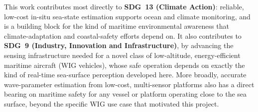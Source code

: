 This work contributes most directly to \textbf{SDG~13 (Climate Action)}: reliable, low-cost in-situ sea-state estimation supports ocean and climate monitoring, and is a building block for the kind of maritime environmental awareness that climate-adaptation and coastal-safety efforts depend on. It also contributes to \textbf{SDG~9 (Industry, Innovation and Infrastructure)}, by advancing the sensing infrastructure needed for a novel class of low-altitude, energy-efficient maritime aircraft (WIG vehicles), whose safe operation depends on exactly the kind of real-time sea-surface perception developed here. More broadly, accurate wave-parameter estimation from low-cost, multi-sensor platforms also has a direct bearing on maritime safety for any vessel or platform operating close to the sea surface, beyond the specific WIG use case that motivated this project.

